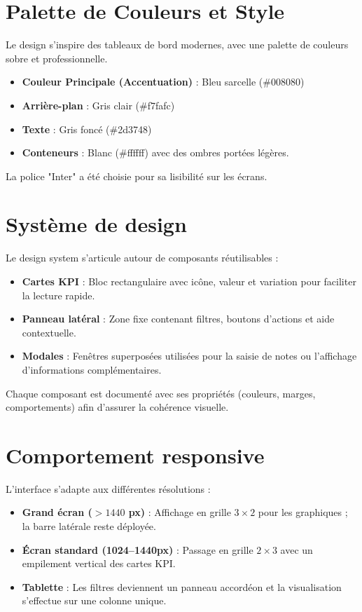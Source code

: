 \section{Palette de Couleurs et Style}
Le design s'inspire des tableaux de bord modernes, avec une palette de couleurs sobre et professionnelle.
\begin{itemize}
    \item \textbf{Couleur Principale (Accentuation)} : Bleu sarcelle (\#008080)
    \item \textbf{Arrière-plan} : Gris clair (\#f7fafc)
    \item \textbf{Texte} : Gris foncé (\#2d3748)
    \item \textbf{Conteneurs} : Blanc (\#ffffff) avec des ombres portées légères.
\end{itemize}
La police "Inter" a été choisie pour sa lisibilité sur les écrans.

\section{Système de design}
Le design system s'articule autour de composants réutilisables :
\begin{itemize}
    \item \textbf{Cartes KPI} : Bloc rectangulaire avec icône, valeur et variation pour faciliter la lecture rapide.
    \item \textbf{Panneau latéral} : Zone fixe contenant filtres, boutons d'actions et aide contextuelle.
    \item \textbf{Modales} : Fenêtres superposées utilisées pour la saisie de notes ou l'affichage d'informations complémentaires.
\end{itemize}
Chaque composant est documenté avec ses propriétés (couleurs, marges, comportements) afin d'assurer la cohérence visuelle.

\section{Comportement responsive}
L'interface s'adapte aux différentes résolutions :
\begin{itemize}
    \item \textbf{Grand écran ($> 1440$ px)} : Affichage en grille $3 \times 2$ pour les graphiques ; la barre latérale reste déployée.
    \item \textbf{Écran standard (1024--1440px)} : Passage en grille $2 \times 3$ avec un empilement vertical des cartes KPI.
    \item \textbf{Tablette} : Les filtres deviennent un panneau accordéon et la visualisation s'effectue sur une colonne unique.
\end{itemize}

